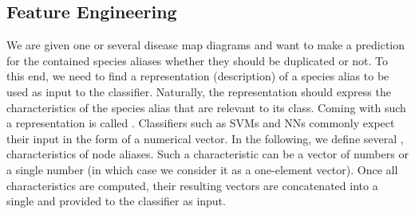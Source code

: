 \documentclass[
	fontsize=10pt, %
	twoside=false, %
	secnumdepth=1, %
  toc=indentunnumbered %
]{kaobook}
\begin{document}

\subsection{Feature Engineering}
\label{sec:feature-selection}

We are given one or several disease map diagrams and want to make a prediction
for the contained species aliases whether they should be duplicated or not. To
this end, we need to find a representation (description) of a species alias to
be used as input to the classifier. Naturally, the representation should express
the characteristics of the species alias that are relevant to its class.
Coming with such a representation is called .
Classifiers such as SVMs and NNs commonly expect their input in the form of a
numerical vector.
%
In the following, we define several , \ie characteristics of node
aliases. Such a characteristic can be a vector of numbers or a single number (in
which case we consider it as a one-element vector). Once all characteristics are
computed, their resulting vectors are concatenated into a single  and provided to the classifier as input.
\end{document}
